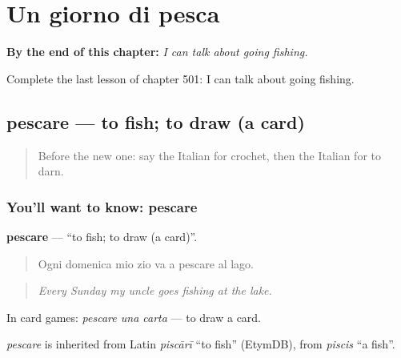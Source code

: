 
\chapter{Un giorno di pesca}
\label{ch:it-un-giorno-di-pesca}

\begin{chapteropening}
\textbf{By the end of this chapter:} \emph{I can talk about going fishing.}

Complete the last lesson of chapter 501: I can talk about going fishing.
\end{chapteropening}

\section[pescare]{pescare — to fish; to draw (a card)}

\label{lesson:IT-C501-pescare}



\begin{quote}
Before the new one: say the Italian for crochet, then the Italian for to darn.
\end{quote}

\subsection*{You'll want to know: pescare}
\textbf{pescare} — \textquotedblleft{}to fish; to draw (a card)\textquotedblright{}.

\begin{quote}
Ogni domenica mio zio va a pescare al lago.
\end{quote}

\begin{quote}
\emph{Every Sunday my uncle goes fishing at the lake.}
\end{quote}

In card games: \emph{pescare una carta} — to draw a card.

\begin{cousinweb}
\emph{pescare} is inherited from Latin \emph{piscārī} \textquotedblleft{}to fish\textquotedblright{} (EtymDB), from \emph{piscis} \textquotedblleft{}a fish\textquotedblright{}.
\end{cousinweb}

